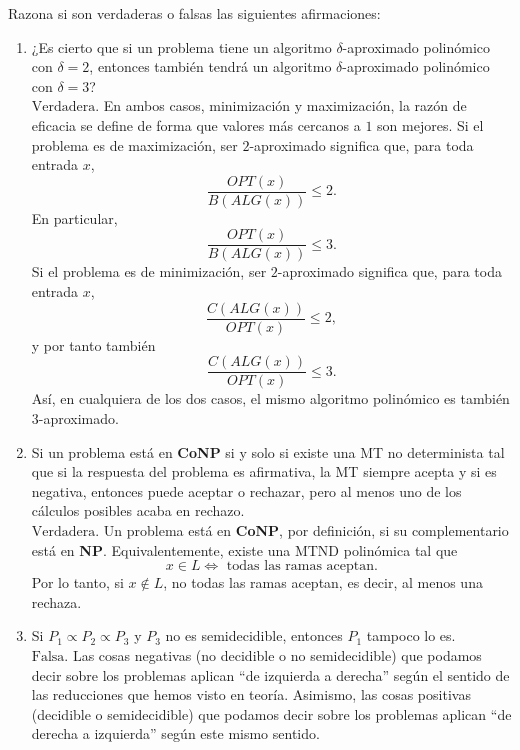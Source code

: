 \documentclass[12pt]{article}
\begin{document}
    \begin{ejercicio}[2 puntos]
        Razona si son verdaderas o falsas las siguientes afirmaciones:
        \begin{enumerate}
            \item ¿Es cierto que si un problema tiene un algoritmo $\delta$-aproximado polinómico con $\delta = 2$, entonces también 
            tendrá un algoritmo $\delta$-aproximado polinómico con $\delta = 3$? \\

            $\boxed{\text{Verdadera}}$. En ambos casos, minimización y maximización, la razón de
            eficacia se define de forma que valores más cercanos a $1$ son mejores. Si el
            problema es de maximización, ser $2$-aproximado significa que, para toda entrada
            $x$,
            $$
            \frac{OPT(x)}{B(ALG(x))}\leq 2.
            $$
            En particular,
            $$
            \frac{OPT(x)}{B(ALG(x))}\leq 3.
            $$
            Si el problema es de minimización, ser $2$-aproximado significa que, para toda
            entrada $x$,
            $$
            \frac{C(ALG(x))}{OPT(x)}\leq 2,
            $$
            y por tanto también
            $$
            \frac{C(ALG(x))}{OPT(x)}\leq 3.
            $$
            Así, en cualquiera de los dos casos, el mismo algoritmo polinómico es también
            $3$-aproximado.
            
            \item Si un problema está en \textbf{CoNP} si y solo si existe una MT no determinista tal que si la respuesta del problema es 
            afirmativa, la MT siempre acepta y si es negativa, entonces puede aceptar o rechazar, pero al menos uno de los cálculos 
            posibles acaba en rechazo. \\
            
            $\boxed{\text{Verdadera}}$. Un problema está en \textbf{CoNP}, por definición, si su complementario está en \textbf{NP}. Equivalentemente,
            existe una MTND polinómica tal que 
            $$x \in L \iff \text{ todas las ramas aceptan.}$$
            Por lo tanto, si $x \notin L$, no todas las ramas aceptan, es decir, al menos una rechaza.

            \item Si $P_1 \propto P_2 \propto P_3$ y $P_3$ no es semidecidible, entonces $P_1$ tampoco lo es. \\
            
            $\boxed{\text{Falsa}}$. Las cosas negativas (no decidible o no semidecidible) que podamos decir sobre los problemas 
            aplican ``de izquierda a derecha'' según el sentido de las reducciones que hemos visto en teoría. Asimismo, las cosas 
            positivas (decidible o semidecidible) que podamos decir sobre los problemas aplican ``de derecha a izquierda''
            según este mismo sentido. \\
            

\end{enumerate}
\end{ejercicio}
\end{document}
